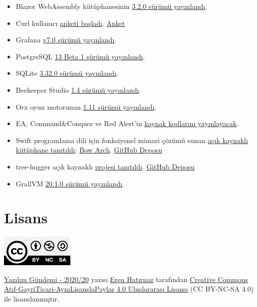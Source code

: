 \documentclass[11pt]{article}
\begin{document}
\begin{itemize}
{Deposu}
\item Blazor WebAssembly kütüphanesinin \href{https://devblogs.microsoft.com/aspnet/blazor-webassembly-3-2-0-now-available/}{3.2.0 sürümü yayınlandı}.
\item Curl kullanıcı \href{https://daniel.haxx.se/blog/2020/05/18/help-curl-the-user-survey-2020/}{anketi başladı}. \href{https://forms.gle/4L4A2de4WgmJbJkg9}{Anket}
\item Grafana \href{https://grafana.com/blog/2020/05/18/grafana-v7.0-released-new-plugin-architecture-visualizations-transformations-native-trace-support-and-more/?isource=hp}{v7.0 sürümü yayınlandı}.
\item PostgreSQL \href{https://www.postgresql.org/about/news/2040/}{13 Beta 1 sürümü yayınlandı}.
\item SQLite \href{https://sqlite.org/releaselog/3\_32\_0.html}{3.32.0 sürümü yayınlandı}.
\item Beekeeper Studio \href{https://www.beekeeperstudio.io/blog/release-1.4}{1.4 sürümü yayınlandı}.
\item Orx oyun motorunun \href{https://www.gamedev.net/news/orx-portable-game-engine-version-111-has-been-released-r1349/}{1.11 sürümü yayınlandı}.
\item EA, Command\&Conquer ve Red Alert'in \href{https://kotaku.com/ea-is-releasing-command-conquer-and-red-alerts-source-1843574798}{kaynak kodlarını yayınlayacak}.
\item Swift programlama dili için fonksiyonel mimari çözümü sunan \href{https://www.47deg.com/blog/bow-arch-0-1-0-release/}{açık kaynaklı
kütüphane tanıtıldı}: \href{https://arch.bow-swift.io/}{Bow Arch}. \href{https://github.com/bow-swift/bow-arch}{GitHub Deposu}
\item tree-hugger açık kaynaklı \href{https://medium.com/codist-ai/introducing-tree-hugger-source-code-mining-for-human-b5fcd31bef55}{projesi tanıtıldı}. \href{https://github.com/autosoft-dev/tree-hugger}{GitHub Deposu}
\item GrallVM \href{https://www.graalvm.org/docs/release-notes/20\_1/}{20.1.0 sürümü yayınlandı}.
\end{itemize}
\section{Lisans}
\label{sec:org144f608}
\begin{center}
\begin{center}
\includegraphics[height=1.5cm]{../../../img/CC_BY-NC-SA_4.0.png}
\end{center}

\href{yazilim-gundemi-2020-20.pdf}{Yazılım Gündemi - 2020/20} yazısı \href{https://erenhatirnaz.github.io}{Eren Hatırnaz} tarafından \href{http://creativecommons.org/licenses/by-nc-sa/4.0/}{Creative Commons
Atıf-GayriTicari-AynıLisanslaPaylaş 4.0 Uluslararası Lisansı} (CC BY-NC-SA 4.0)
ile lisanslanmıştır.
\end{center}
\end{document}
